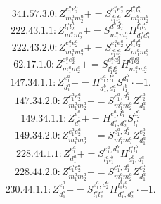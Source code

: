 \documentclass[letterpaper,10pt,fleqn,leqno,onecolumn]{article}
\begin{document}
\begin{equation} \;\;\;\;\;\;  341.57.3.0: Z^{e_{1}^{a}e_{2}^{a}}_{m_{1}^{a}m_{2}^{a}}+=S^{e_{1}^{a}e_{2}^{a}}_{l_{1}^{a}l_{2}^{a}}Z^{l_{1}^{a}l_{2}^{a}}_{m_{1}^{a}m_{2}^{a}} \end{equation}
\begin{equation} \;\;\;\;\;\;  222.43.1.1: Z^{l_{1}^{a}l_{2}^{a}}_{m_{1}^{a}m_{2}^{a}}+=S^{d_{1}^{a}d_{2}^{a}}_{m_{1}^{a}m_{2}^{a}}H^{l_{1}^{a}l_{2}^{a}}_{d_{1}^{a}d_{2}^{a}} \end{equation}
\begin{equation} \;\;\;\;\;\;  222.43.2.0: Z^{e_{1}^{a}e_{2}^{a}}_{m_{1}^{a}m_{2}^{a}}+=S^{e_{1}^{a}e_{2}^{a}}_{l_{1}^{a}l_{2}^{a}}Z^{l_{1}^{a}l_{2}^{a}}_{m_{1}^{a}m_{2}^{a}} \end{equation}
\begin{equation} \;\;\;\;\;\;  62.17.1.0: Z^{e_{1}^{a}e_{2}^{a}}_{m_{1}^{a}m_{2}^{a}}+=S^{e_{1}^{a}e_{2}^{a}}_{l_{1}^{a}l_{2}^{a}}H^{l_{1}^{a}l_{2}^{a}}_{m_{1}^{a}m_{2}^{a}} \end{equation}
\begin{equation} \;\;\;\;\;\;  147.34.1.1: Z^{e_{1}^{a}}_{d_{1}^{a}}+=H^{e_{1}^{a},l_{1}^{b}}_{d_{1}^{b},d_{1}^{a}}S^{d_{1}^{b}}_{l_{1}^{b}}\cdot -1. \end{equation}
\begin{equation} \;\;\;\;\;\;  147.34.2.0: Z^{e_{1}^{a}e_{2}^{a}}_{m_{1}^{a}m_{2}^{a}}+=S^{e_{1}^{a},d_{1}^{a}}_{m_{1}^{a}m_{2}^{a}}Z^{e_{2}^{a}}_{d_{1}^{a}} \end{equation}
\begin{equation} \;\;\;\;\;\;  149.34.1.1: Z^{e_{1}^{a}}_{d_{1}^{a}}+=H^{e_{1}^{a},l_{1}^{a}}_{d_{1}^{a},d_{2}^{a}}S^{d_{2}^{a}}_{l_{1}^{a}} \end{equation}
\begin{equation} \;\;\;\;\;\;  149.34.2.0: Z^{e_{1}^{a}e_{2}^{a}}_{m_{1}^{a}m_{2}^{a}}+=S^{e_{1}^{a},d_{1}^{a}}_{m_{1}^{a}m_{2}^{a}}Z^{e_{2}^{a}}_{d_{1}^{a}} \end{equation}
\begin{equation} \;\;\;\;\;\;  228.44.1.1: Z^{e_{1}^{a}}_{d_{1}^{a}}+=S^{e_{1}^{a},d_{1}^{b}}_{l_{1}^{a}l_{1}^{b}}H^{l_{1}^{a}l_{1}^{b}}_{d_{1}^{b},d_{1}^{a}} \end{equation}
\begin{equation} \;\;\;\;\;\;  228.44.2.0: Z^{e_{1}^{a}e_{2}^{a}}_{m_{1}^{a}m_{2}^{a}}+=S^{e_{1}^{a},d_{1}^{a}}_{m_{1}^{a}m_{2}^{a}}Z^{e_{2}^{a}}_{d_{1}^{a}} \end{equation}
\begin{equation} \;\;\;\;\;\;  230.44.1.1: Z^{e_{1}^{a}}_{d_{1}^{a}}+=S^{e_{1}^{a},d_{2}^{a}}_{l_{1}^{a}l_{2}^{a}}H^{l_{1}^{a}l_{2}^{a}}_{d_{1}^{a},d_{2}^{a}}\cdot -1. \end{equation}
\end{document}
